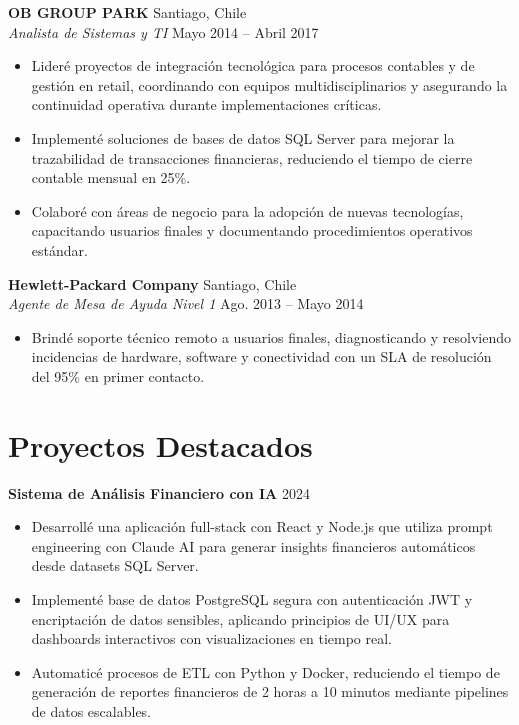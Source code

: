 \documentclass[11pt,letterpaper]{article}
\begin{document}
\vspace{2pt}
\textbf{OB GROUP PARK} \hfill Santiago, Chile\\
\textit{Analista de Sistemas y TI} \hfill Mayo 2014 – Abril 2017
\begin{itemize}
  \item Lideré proyectos de integración tecnológica para procesos contables y de gestión en retail, coordinando con equipos multidisciplinarios y asegurando la continuidad operativa durante implementaciones críticas.
  \item Implementé soluciones de bases de datos SQL Server para mejorar la trazabilidad de transacciones financieras, reduciendo el tiempo de cierre contable mensual en 25\%.
  \item Colaboré con áreas de negocio para la adopción de nuevas tecnologías, capacitando usuarios finales y documentando procedimientos operativos estándar.
\end{itemize}
\vspace{2pt}
\textbf{Hewlett-Packard Company} \hfill Santiago, Chile\\
\textit{Agente de Mesa de Ayuda Nivel 1} \hfill Ago. 2013 – Mayo 2014
\begin{itemize}
  \item Brindé soporte técnico remoto a usuarios finales, diagnosticando y resolviendo incidencias de hardware, software y conectividad con un SLA de resolución del 95\% en primer contacto.
\end{itemize}

\section{Proyectos Destacados}

\textbf{Sistema de Análisis Financiero con IA} \hfill 2024
\begin{itemize}
  \item Desarrollé una aplicación full-stack con React y Node.js que utiliza prompt engineering con Claude AI para generar insights financieros automáticos desde datasets SQL Server.
  \item Implementé base de datos PostgreSQL segura con autenticación JWT y encriptación de datos sensibles, aplicando principios de UI/UX para dashboards interactivos con visualizaciones en tiempo real.
  \item Automaticé procesos de ETL con Python y Docker, reduciendo el tiempo de generación de reportes financieros de 2 horas a 10 minutos mediante pipelines de datos escalables.
\end{itemize}
\end{document}
